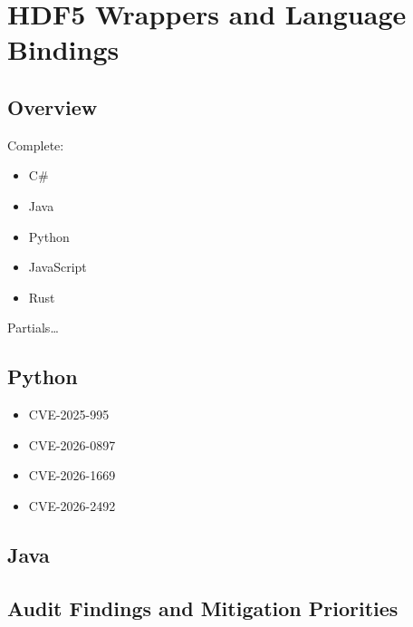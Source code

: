 \documentclass[../main.tex]{subfiles}
\begin{document}
\section{HDF5 Wrappers and Language Bindings}
\label{sec:wrappers}

\subsection{Overview}

Complete:
\begin{itemize}
    \item C\#
    \item Java
    \item Python
    \item JavaScript
    \item Rust
\end{itemize}

Partials\ldots

\subsection{Python}

\begin{itemize}
    \item CVE-2025-995 \cite{cve-2025-9905}
    \item CVE-2026-0897 \cite{cve-2026-0897}
    \item CVE-2026-1669 \cite{cve-2026-1669}
    \item CVE-2026-2492 \cite{cve-2026-2492}
\end{itemize}

\subsection{Java}

\subsection{Audit Findings and Mitigation Priorities}
\end{document}
